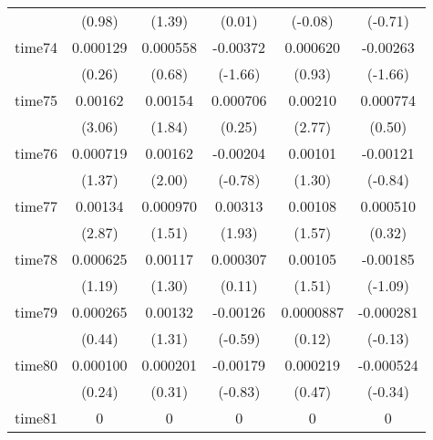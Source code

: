 \begin{table}[htbp]
\begin{tabular}{l*{5}{c}}
            &      (0.98)         &      (1.39)         &      (0.01)         &     (-0.08)         &     (-0.71)         \\
time74      &    0.000129         &    0.000558         &    -0.00372         &    0.000620         &    -0.00263         \\
            &      (0.26)         &      (0.68)         &     (-1.66)         &      (0.93)         &     (-1.66)         \\
time75      &     0.00162\sym{**} &     0.00154         &    0.000706         &     0.00210\sym{**} &    0.000774         \\
            &      (3.06)         &      (1.84)         &      (0.25)         &      (2.77)         &      (0.50)         \\
time76      &    0.000719         &     0.00162\sym{*}  &    -0.00204         &     0.00101         &    -0.00121         \\
            &      (1.37)         &      (2.00)         &     (-0.78)         &      (1.30)         &     (-0.84)         \\
time77      &     0.00134\sym{**} &    0.000970         &     0.00313         &     0.00108         &    0.000510         \\
            &      (2.87)         &      (1.51)         &      (1.93)         &      (1.57)         &      (0.32)         \\
time78      &    0.000625         &     0.00117         &    0.000307         &     0.00105         &    -0.00185         \\
            &      (1.19)         &      (1.30)         &      (0.11)         &      (1.51)         &     (-1.09)         \\
time79      &    0.000265         &     0.00132         &    -0.00126         &   0.0000887         &   -0.000281         \\
            &      (0.44)         &      (1.31)         &     (-0.59)         &      (0.12)         &     (-0.13)         \\
time80      &    0.000100         &    0.000201         &    -0.00179         &    0.000219         &   -0.000524         \\
            &      (0.24)         &      (0.31)         &     (-0.83)         &      (0.47)         &     (-0.34)         \\
time81      &           0         &           0         &           0         &           0         &           0         \\

\end{tabular}
\end{table}
